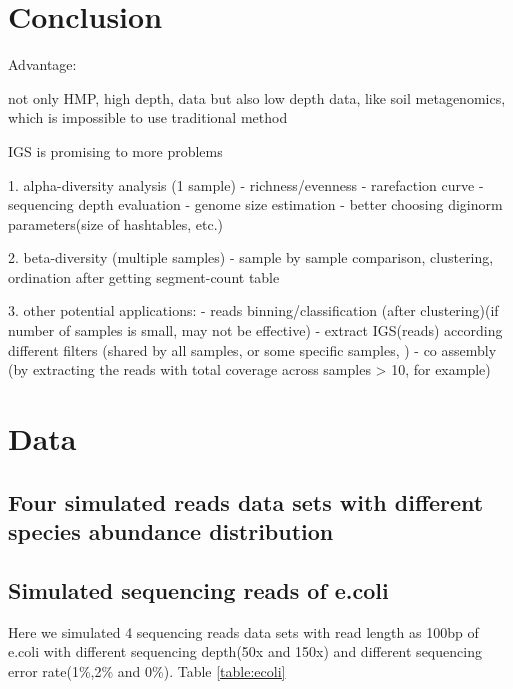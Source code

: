 





\section{Conclusion}

Advantage:

not only HMP, high depth, data
but also low depth data, like soil metagenomics, which is impossible to use traditional method 


IGS is promising to more problems

1. alpha-diversity analysis (1 sample)
    - richness/evenness
    - rarefaction curve
    - sequencing depth evaluation
    - genome size estimation
    - better choosing diginorm parameters(size of hashtables, etc.)

2. beta-diversity (multiple samples)
    - sample by sample comparison, clustering, ordination after getting segment-count table

3. other potential applications:
    - reads binning/classification (after clustering)(if number of samples is small, may not be effective)
    - extract IGS(reads) according different filters (shared by all samples, or some specific samples, )
    - co assembly (by extracting the reads with total coverage across samples > 10, for example)
    
    

\section{Data}


\subsection{Four simulated reads data sets with different species abundance distribution}

\subsection{Simulated sequencing reads of e.coli}

Here we simulated 4 sequencing reads data sets with read length as 100bp of e.coli with different sequencing depth(50x and 150x) and different sequencing error rate(1\%,2\% and 0\%). Table \ref{table:ecoli}

